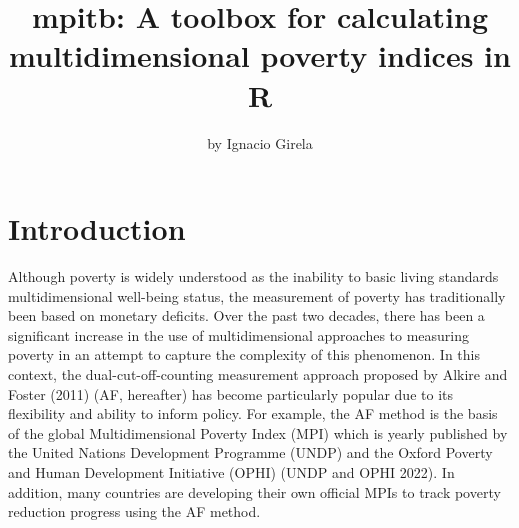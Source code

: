 \title{mpitb: A toolbox for calculating multidimensional poverty indices in R}


\author{by Ignacio Girela}

\maketitle


\hypertarget{introduction}{%
\section{Introduction}\label{introduction}}

Although poverty is widely understood as the inability to basic living standards multidimensional well-being status, the measurement of poverty has traditionally been based on monetary deficits. Over the past two decades, there has been a significant increase in the use of multidimensional approaches to measuring poverty in an attempt to capture the complexity of this phenomenon. In this context, the dual-cut-off-counting measurement approach proposed by Alkire and Foster (2011) (AF, hereafter) has become particularly popular due to its flexibility and ability to inform policy. For example, the AF method is the basis of the global Multidimensional Poverty Index (MPI) which is yearly published by the United Nations Development Programme (UNDP) and the Oxford Poverty and Human Development Initiative (OPHI) (UNDP and OPHI 2022). In addition, many countries are developing their own official MPIs to track poverty reduction progress using the AF method.

